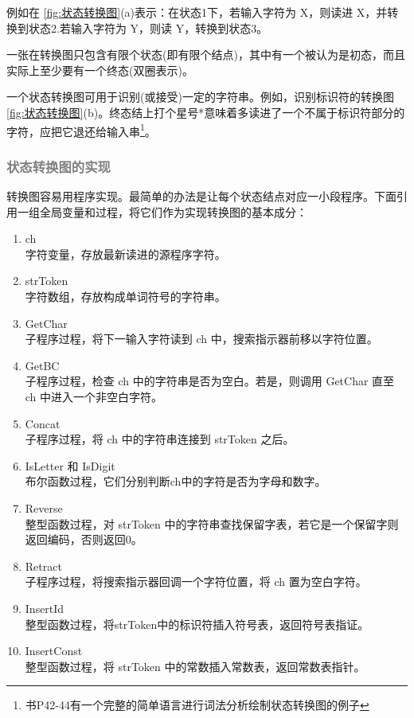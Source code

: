 例如在 \ref{fig:状态转换图}(a)表示：在状态1下，若输入字符为 X，则读进 X，并转换到状态2.若输入字符为 Y，则读 Y，转换到状态3。

一张在转换图只包含\textcolor{tip}{有限个状态(即有限个结点)，其中有一个被认为是初态，而且实际上至少要有一个终态(双圈表示)。}

一个状态转换图可用于识别(或接受)一定的字符串。例如，识别标识符的转换图 \ref{fig:状态转换图}(b)。\textcolor{tip}{终态结上打个星号*意味着多读进了一个不属于标识符部分的字符，应把它退还给输入串\footnote{书P42-44有一个完整的简单语言进行词法分析绘制状态转换图的例子}。}

\subsubsection{\textcolor{grey}{状态转换图的实现}}

转换图容易用程序实现。最简单的办法是让每个状态结点对应一小段程序。下面引用一组全局变量和过程，将它们作为实现转换图的基本成分：

\begin{enumerate}
    \item ch \\
          字符变量，存放最新读进的源程序字符。
    \item strToken \\
          字符数组，存放构成单词符号的字符串。
    \item  GetChar \\
          子程序过程，将下一输入字符读到 ch 中，搜索指示器前移以字符位置。
    \item GetBC \\
          子程序过程，检查 ch 中的字符串是否为空白。若是，则调用 GetChar 直至 ch 中进入一个非空白字符。
    \item Concat \\
          子程序过程，将 ch 中的字符串连接到 strToken 之后。
    \item IsLetter 和 IsDigit \\
          布尔函数过程，它们分别判断ch中的字符是否为字母和数字。
    \item Reverse \\
          整型函数过程，对 strToken 中的字符串查找保留字表，若它是一个保留字则返回编码，否则返回0。
    \item Retract \\
          子程序过程，将搜索指示器回调一个字符位置，将 ch 置为空白字符。
    \item InsertId \\
          整型函数过程，将strToken中的标识符插入符号表，返回符号表指证。
    \item InsertConst \\
          整型函数过程，将 strToken 中的常数插入常数表，返回常数表指针。
\end{enumerate}

